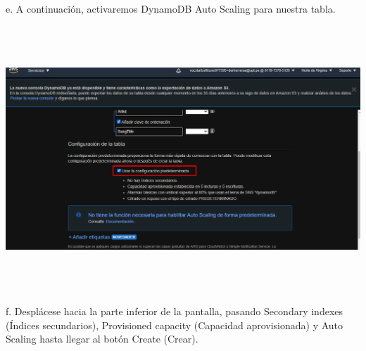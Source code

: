 \documentclass[12pt,letterpaper]{article}
\begin{document}
e. A continuación, activaremos DynamoDB Auto Scaling para nuestra tabla.
\begin{center}
    \includegraphics[width=18cm, height=10cm]{img/e.png}  
\end{center}

f. Desplácese hacia la parte inferior de la pantalla, pasando Secondary indexes (Índices secundarios), Provisioned capacity (Capacidad aprovisionada) y Auto Scaling hasta llegar al botón Create (Crear). 
\end{document}
